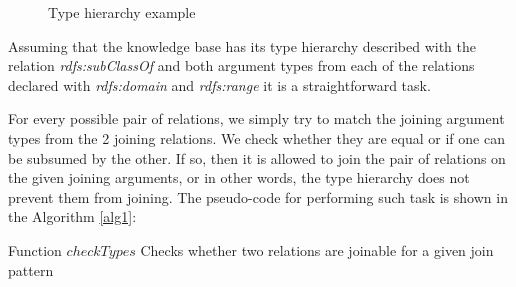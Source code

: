 \begin{figure}[!h]
  \caption{Type hierarchy example}
  \centering

\label{fig:typeHierarchy}
\end{figure}

Assuming that the knowledge base has its type hierarchy described with the relation \emph{rdfs:subClassOf} and both
argument types from each of the relations declared with \emph{rdfs:domain} and \emph{rdfs:range} it is a
straightforward task.

For every possible pair of relations, we simply try to match the joining argument types from the 2 joining relations. We
check whether they are equal or if one can be subsumed by the other. If so, then it is allowed to join the pair of
relations
on the given joining arguments, or in other words, the type hierarchy does not prevent them from joining. The
pseudo-code
for performing such task is
shown in the Algorithm \ref{alg1}:

\begin{algorithm}[!h]
  \caption{Function $checkTypes$ \newline Checks whether two relations are joinable for a given join pattern}
 \label{alg1}
   {
  }
   {
  }
\end{algorithm}

